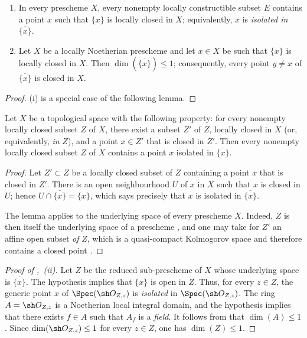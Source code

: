 \begin{proposition}[5.1.10]
\label{IV.5.1.10}
\begin{enumerate}[{\rm(i)}]
\item
{}
\label{IV.5.1.10.i}
In every prescheme $X$, every nonempty locally constructible subset
$E$ contains a point $x$ such that $\{x\}$ is locally closed in $X$;
equivalently, $x$ is \emph{isolated in} $\overline{\{x\}}$.
\item
{}
\label{IV.5.1.10.ii}
Let $X$ be a locally Noetherian prescheme and let $x\in X$ be such
that $\{x\}$ is locally closed in $X$.
Then $\dim(\overline{\{x\}})\leq1$; consequently, every point
$y\ne x$ of $\overline{\{x\}}$ is closed in $X$.
\end{enumerate}
\end{proposition}

\begin{proof}
\textup{(i)} is a special case of the following lemma.
\end{proof}

\begin{lemma}[5.1.10.1]
\label{IV.5.1.10.1}
Let $X$ be a topological space with the following property: for every
nonempty locally closed subset $Z$ of $X$, there exist a subset
$Z'$ of $Z$, locally closed in $X$ \textup{(or, equivalently, \emph{in} $Z$)}, and
a point $x\in Z'$ that is closed \textup{in} $Z'$.
Then every nonempty locally closed subset $Z$ of $X$ contains a point
$x$ isolated in $\overline{\{x\}}$.
\end{lemma}

\begin{proof}
Let $Z'\subset Z$ be a locally closed subset of $Z$ containing a
point $x$ that is closed in $Z'$.
There is an open neighbourhood $U$ of $x$ in $X$ such that $x$ is
closed in $U$; hence $U\cap\overline{\{x\}}=\{x\}$,
which says precisely that $x$ is isolated in $\overline{\{x\}}$.

The lemma applies to the underlying space of every prescheme $X$.
Indeed, $Z$ is then itself the underlying space of a prescheme
, and one may take for $Z'$ an affine open subset \emph{of}
$Z$, which is a quasi-compact Kolmogorov space and therefore contains
a closed point .
\end{proof}


\begin{proof}[Proof of ,~(ii)]
Let $Z$ be the reduced sub-prescheme of $X$ whose underlying space is
$\overline{\{x\}}$.
The hypothesis implies that $\{x\}$ is open in $Z$.
Thus, for every $z\in Z$, the generic point $x$ of
$\Spec(\sh O_{Z,z})$ is \emph{isolated} in $\Spec(\sh O_{Z,z})$.
The ring $A=\sh O_{Z,z}$ is a Noetherian local integral domain, and
the hypothesis implies that there exists $f\in A$ such that $A_f$ is
a \emph{field}.
It follows from  that $\dim(A)\leq1$.
Since $\dim(\sh O_{Z,z})\leq1$ for every $z\in Z$, one has
$\dim(Z)\leq1$.
\end{proof}

